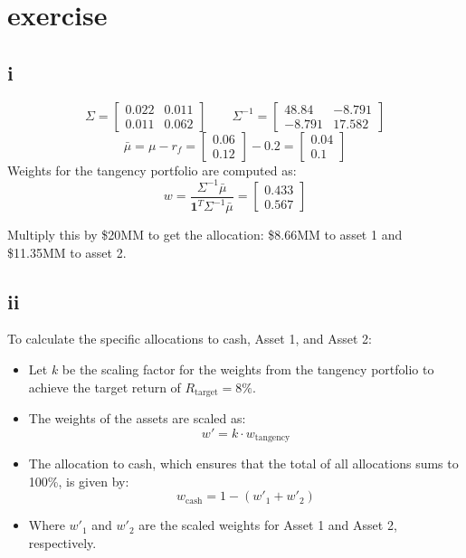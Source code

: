 \documentclass{article}
\begin{document}
\section{exercise}
\subsection*{i}
$$\displaystyle \Sigma = \left[\begin{matrix}0.022 & 0.011\\0.011 & 0.062\end{matrix}\right]\qquad \Sigma^{-1} = \displaystyle \left[\begin{matrix}48.84 & -8.791\\-8.791 & 17.582\end{matrix}\right]$$
$$\bar\mu = \mu - r_f = \displaystyle \left[\begin{matrix}0.06\\0.12\end{matrix}\right] - 0.2= \displaystyle \left[\begin{matrix}0.04\\0.1\end{matrix}\right]$$
Weights for the tangency portfolio are computed as:
\[
    w = \frac{\Sigma^{-1} \bar{\mu}}{\mathbf{1}^T \Sigma^{-1} \bar{\mu}} = \displaystyle \left[\begin{matrix}0.433\\0.567\end{matrix}\right]
\]

Multiply this by \$20MM to get the allocation: \$8.66MM to asset 1 and \$11.35MM to asset 2.

\subsection*{ii}
To calculate the specific allocations to cash, Asset 1, and Asset 2:
\begin{itemize}
    \item Let \( k \) be the scaling factor for the weights from the tangency portfolio to achieve the target return of $R_\text{target} = 8\%$.
    \item The weights of the assets are scaled as:
          \[ w' = k \cdot w_{\text{tangency}} \]
    \item The allocation to cash, which ensures that the total of all allocations sums to 100\%, is given by:
          \[ w_{\text{cash}} = 1 - (w'_1 + w'_2) \]
    \item Where \( w'_1 \) and \( w'_2 \) are the scaled weights for Asset 1 and Asset 2, respectively.
\end{itemize}
\end{document}
